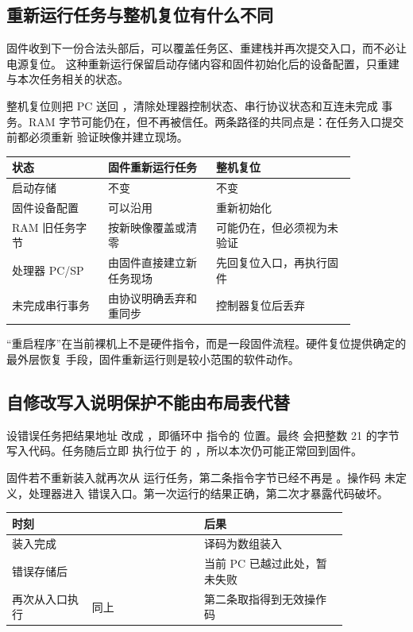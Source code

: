 \subsection{重新运行任务与整机复位有什么不同}

固件收到下一份合法头部后，可以覆盖任务区、重建栈并再次提交入口，而不必让电源复位。
这种重新运行保留启动存储内容和固件初始化后的设备配置，只重建与本次任务相关的状态。

整机复位则把 PC 送回 ，清除处理器控制状态、串行协议状态和互连未完成
事务。RAM 字节可能仍在，但不再被信任。两条路径的共同点是：在任务入口提交前都必须重新
验证映像并建立现场。

\begin{longtable}{|L{0.24\linewidth}|L{0.27\linewidth}|L{0.35\linewidth}|}
\hline
状态 & 固件重新运行任务 & 整机复位 \\ \hline
启动存储 & 不变 & 不变 \\ \hline
固件设备配置 & 可以沿用 & 重新初始化 \\ \hline
RAM 旧任务字节 & 按新映像覆盖或清零 & 可能仍在，但必须视为未验证 \\ \hline
处理器 PC/SP & 由固件直接建立新任务现场 & 先回复位入口，再执行固件 \\ \hline
未完成串行事务 & 由协议明确丢弃和重同步 & 控制器复位后丢弃 \\ \hline
\end{longtable}

“重启程序”在当前裸机上不是硬件指令，而是一段固件流程。硬件复位提供确定的最外层恢复
手段，固件重新运行则是较小范围的软件动作。

\subsection{自修改写入说明保护不能由布局表代替}

设错误任务把结果地址  改成 ，即循环中  指令的
位置。最终  会把整数 21 的字节  写入代码。任务随后立即
执行位于  的 ，所以本次仍可能正常回到固件。

固件若不重新装入就再次从  运行任务，第二条指令字节已经不再是
。操作码  未定义，处理器进入
 错误入口。第一次运行的结果正确，第二次才暴露代码破坏。

\begin{longtable}{|L{0.20\linewidth}|L{0.28\linewidth}|L{0.36\linewidth}|}
\hline
时刻 &  & 后果 \\ \hline
装入完成 &  & 译码为数组装入 \\ \hline
错误存储后 &  & 当前 PC 已越过此处，暂未失败 \\ \hline
再次从入口执行 & 同上 & 第二条取指得到无效操作码 \\ \hline
\end{longtable}

